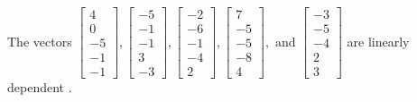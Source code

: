 \begin{exercise}
\begin{exerciseStatement}
  \end{exerciseStatement}
  \begin{exerciseAnswer}
   The vectors \(\left[\begin{array}{r}
4 \\
0 \\
-5 \\
-1 \\
-1
\end{array}\right] , \left[\begin{array}{r}
-5 \\
-1 \\
-1 \\
3 \\
-3
\end{array}\right] , \left[\begin{array}{r}
-2 \\
-6 \\
-1 \\
-4 \\
2
\end{array}\right] , \left[\begin{array}{r}
7 \\
-5 \\
-5 \\
-8 \\
4
\end{array}\right] , \text{ and } \left[\begin{array}{r}
-3 \\
-5 \\
-4 \\
2 \\
3
\end{array}\right]\) are 
  	 linearly dependent  .
  


  \end{exerciseAnswer}
\end{exercise}